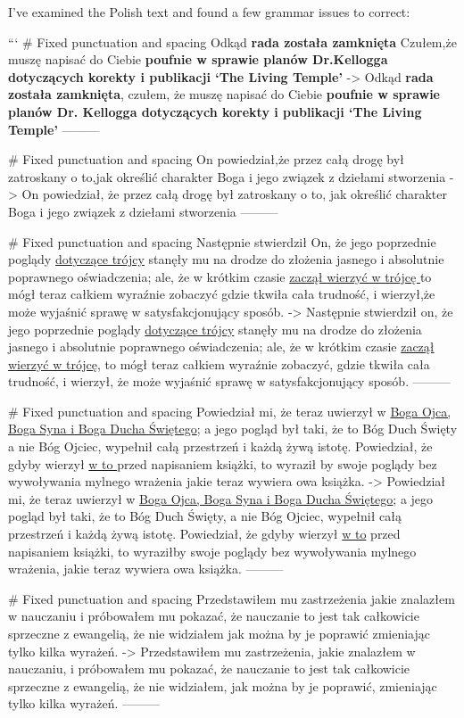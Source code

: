 I've examined the Polish text and found a few grammar issues to correct:

```
# Fixed punctuation and spacing
Odkąd \textbf{rada została zamknięta} Czułem,że muszę napisać do Ciebie \textbf{poufnie w sprawie planów Dr.Kellogga  dotyczących korekty i publikacji ‘The Living Temple’}
->
Odkąd \textbf{rada została zamknięta}, czułem, że muszę napisać do Ciebie \textbf{poufnie w sprawie planów Dr. Kellogga dotyczących korekty i publikacji ‘The Living Temple’}
---------

# Fixed punctuation and spacing
On powiedział,że przez całą drogę był zatroskany o to,jak określić charakter Boga i jego związek z dziełami stworzenia
->
On powiedział, że przez całą drogę był zatroskany o to, jak określić charakter Boga i jego związek z dziełami stworzenia
---------

# Fixed punctuation and spacing
Następnie stwierdził On, że jego poprzednie poglądy \underline{dotyczące trójcy} stanęły mu na drodze do złożenia jasnego i absolutnie poprawnego oświadczenia; ale, że w krótkim czasie \underline{zaczął wierzyć w trójcę } to mógł teraz całkiem wyraźnie zobaczyć gdzie tkwiła cała trudność, i wierzył,że może wyjaśnić sprawę w satysfakcjonujący sposób.
->
Następnie stwierdził on, że jego poprzednie poglądy \underline{dotyczące trójcy} stanęły mu na drodze do złożenia jasnego i absolutnie poprawnego oświadczenia; ale, że w krótkim czasie \underline{zaczął wierzyć w trójcę}, to mógł teraz całkiem wyraźnie zobaczyć, gdzie tkwiła cała trudność, i wierzył, że może wyjaśnić sprawę w satysfakcjonujący sposób.
---------

# Fixed punctuation and spacing
Powiedział mi, że teraz uwierzył w \underline{Boga Ojca, Boga Syna i Boga Ducha Świętego}; a jego pogląd był taki, że to Bóg Duch Święty  a nie Bóg Ojciec, wypełnił całą przestrzeń i każdą żywą istotę. Powiedział, że gdyby  wierzył \underline{w to } przed napisaniem książki, to wyraził by swoje poglądy bez wywoływania mylnego wrażenia jakie teraz wywiera owa książka.
->
Powiedział mi, że teraz uwierzył w \underline{Boga Ojca, Boga Syna i Boga Ducha Świętego}; a jego pogląd był taki, że to Bóg Duch Święty, a nie Bóg Ojciec, wypełnił całą przestrzeń i każdą żywą istotę. Powiedział, że gdyby wierzył \underline{w to} przed napisaniem książki, to wyraziłby swoje poglądy bez wywoływania mylnego wrażenia, jakie teraz wywiera owa książka.
---------

# Fixed punctuation and spacing
Przedstawiłem mu zastrzeżenia jakie znalazłem w nauczaniu i próbowałem mu pokazać, że nauczanie to jest tak całkowicie sprzeczne z ewangelią, że nie widziałem jak można by je poprawić zmieniając tylko kilka wyrażeń.
->
Przedstawiłem mu zastrzeżenia, jakie znalazłem w nauczaniu, i próbowałem mu pokazać, że nauczanie to jest tak całkowicie sprzeczne z ewangelią, że nie widziałem, jak można by je poprawić, zmieniając tylko kilka wyrażeń.
---------

